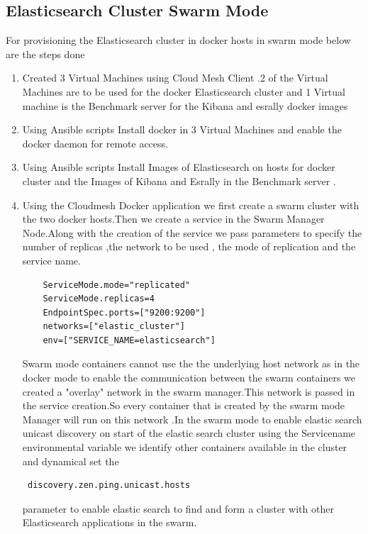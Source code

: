 \documentclass[9pt,twocolumn,twoside]{../../styles/osajnl}
\begin{document}
 \subsection{Elasticsearch Cluster Swarm Mode}
  For provisioning the Elasticsearch cluster in docker hosts in swarm mode below are the steps done
\begin{enumerate}
\item Created 3 Virtual Machines using Cloud Mesh Client .2 of the Virtual Machines  are to be used for the docker Elasticsearch cluster and 1 Virtual machine is the Benchmark server for the Kibana and esrally docker images 
\item Using Ansible scripts Install docker in 3 Virtual Machines and enable the docker daemon for remote access.
\item Using Ansible scripts Install Images of Elasticsearch  on hosts for docker cluster and the Images of Kibana and Esrally in the Benchmark server .
\item Using the Cloudmesh Docker application we first create a swarm cluster with the two docker hosts.Then we create a service in the Swarm  Manager Node.Along with the creation of the service we pass parameters to specify the number of replicas ,the network to be used , the mode of replication and the service name.
\begin{verbatim}
    ServiceMode.mode="replicated" 
    ServiceMode.replicas=4 
    EndpointSpec.ports=["9200:9200"] 
    networks=["elastic_cluster"] 
    env=["SERVICE_NAME=elasticsearch"]
\end{verbatim}

Swarm mode containers cannot use the the underlying host network as in the docker mode to enable the communication between the swarm containers we created a "overlay" network in the swarm manager.This network is passed in the service creation.So every container that is created by the swarm mode Manager will run on  this network .In the swarm mode to enable elastic search unicast discovery on start of the elastic search cluster using the Servicename environmental variable we identify other containers available in the cluster and dynamical set the \begin{verbatim} discovery.zen.ping.unicast.hosts \end{verbatim} parameter to enable elastic search to find and form a cluster with other Elasticsearch applications in the swarm.

\end{enumerate}
\end{document}
